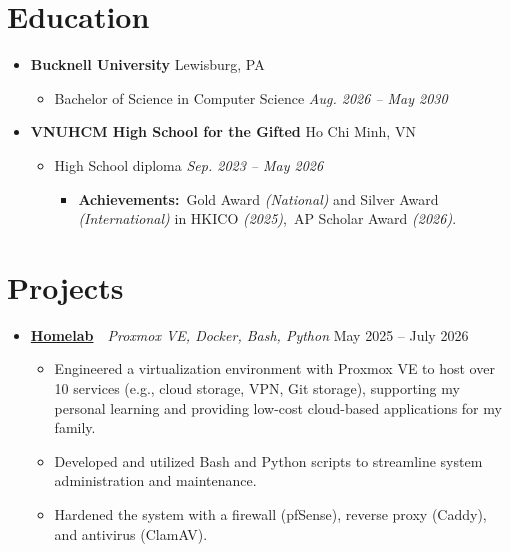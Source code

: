 \documentclass[letterpaper, 12pt]{article}
\newenvironment{ListHeading}{
    \begin{itemize}[
        leftmargin=0.1in, label={},
        itemsep=0.4em, parsep=0pt
    ]
}{ \end{itemize} }
\newenvironment{ListSubheading}{
    \begin{itemize}[
        leftmargin=0.15in, label={},
        itemsep=0.2em, parsep=0pt, topsep=-0.5em
    ]
}{ \end{itemize} }
\newenvironment{ListContent}{
    \begin{itemize}[
        leftmargin=0.2in, label=\textbullet,
        itemsep=0.15em, parsep=0pt, topsep=0.15em
    ]
}{ \end{itemize} }
\newcommand{\listItemHeadingEducation}[2]{
    \item
    \textbf{#1} \hspace{3em}\hfill #2
}
\newcommand{\listItemHeadingProjects}[4]{
    \item
    \textbf{\href{https://#4}{#1}}\
    \textbar \ \textit{#3} \hspace{3em}\hfill #2
}
\newcommand{\listItemSubheading}[3][]{
    \item[#1]
    #2 \hfill \textit{#3}
}
\newcommand{\listItemContent}[1]{
    \item \small{#1}
}
\begin{document}
\section{Education}
    \begin{ListHeading}
        \listItemHeadingEducation
            {Bucknell University}{Lewisburg, PA}
            \begin{ListSubheading}
                \listItemSubheading
                    {Bachelor of Science in Computer Science}
                    {Aug. 2026 -- May 2030}
            \end{ListSubheading}
        \listItemHeadingEducation
            {VNUHCM High School for the Gifted}{Ho Chi Minh, VN}
            \begin{ListSubheading}
                \listItemSubheading
                    {High School diploma}
                    {Sep. 2023 -- May 2026}
                    \begin{ListContent}
                        \listItemContent
                        {
                            \textbf{Achievements:}\
                            Gold Award \textit{(National)} and Silver Award \textit{(International)} in HKICO \textit{(2025)},\
                            AP Scholar Award \textit{(2026)}.
                        }
                    \end{ListContent}
            \end{ListSubheading}
    \end{ListHeading}

\section{Projects}
    \begin{ListHeading}
        \listItemHeadingProjects
            {Homelab}{May 2025 -- July 2026}
            {Proxmox VE, Docker, Bash, Python}
            {github.com/techmoocher/homelab}
            \begin{ListContent}
                \listItemContent
                    {Engineered a virtualization environment with Proxmox VE to host over 10 services (e.g., cloud storage, VPN, Git storage), supporting my personal learning and providing low-cost cloud-based applications for my family.}
                \listItemContent
                    {Developed and utilized Bash and Python scripts to streamline system administration and maintenance.}
                \listItemContent
                    {Hardened the system with a firewall (pfSense), reverse proxy (Caddy), and antivirus (ClamAV).}
            \end{ListContent}
    \end{ListHeading}
\end{document}
